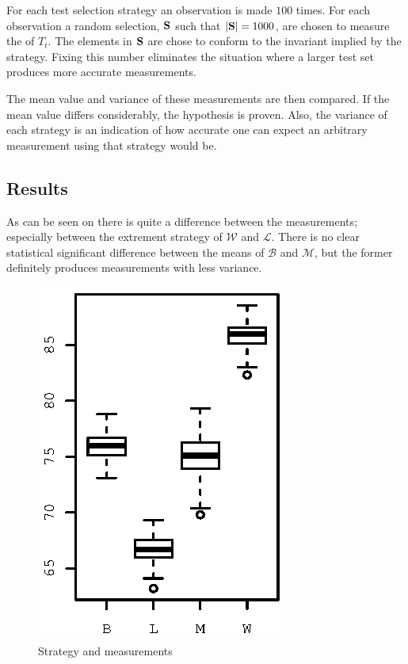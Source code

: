 For each test selection strategy an observation is made $100$ times.  For each observation a random selection, ${\bf S}$ such that $|{\bf S}| = 1000$, are chosen to measure the  of $T_t$. The elements in ${\bf S}$ are chose to conform to the invariant implied by the strategy.  Fixing this number eliminates the situation where a larger test set produces more accurate measurements.

The mean value and variance of these measurements are then compared.   If the mean value differs considerably, the hypothesis is proven.  Also, the variance of each strategy is an indication of how accurate one can expect an arbitrary measurement using that strategy would be.  
      
\subsection{Results}
As can be seen on  there is quite a difference between the measurements; especially between the extrement strategy of $\mathcal W$ and $\mathcal L$.  There is no clear statistical significant difference between the means of $\mathcal B$ and $\mathcal M$, but the former definitely produces measurements with less variance.   
\begin{figure} 
\center
\includegraphics{artifacts/c4-025box.eps}
\caption{Strategy and measurements}
\label{fig:c4-025}
\end{figure}

